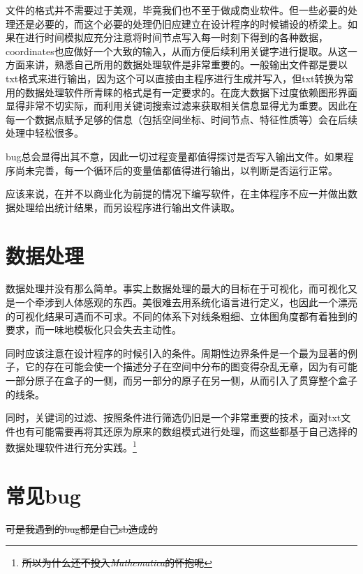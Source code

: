 \documentclass[12pt,a4paper]{article}
\begin{document}
文件的格式并不需要过于美观，毕竟我们也不至于做成商业软件。但一些必要的处理还是必要的，而这个必要的处理仍旧应建立在设计程序的时候铺设的桥梁上。如果在进行时间模拟应充分注意将时间节点写入每一时刻下得到的各种数据，coordinates也应做好一个大致的输入，从而方便后续利用关键字进行提取。从这一方面来讲，熟悉自己所用的数据处理软件是非常重要的。一般输出文件都是要以txt格式来进行输出，因为这个可以直接由主程序进行生成并写入，但txt转换为常用的数据处理软件所青睐的格式是有一定要求的。在庞大数据下过度依赖图形界面显得非常不切实际，而利用关键词搜索过滤来获取相关信息显得尤为重要。因此在每一个数据点赋予足够的信息（包括空间坐标、时间节点、特征性质等）会在后续处理中轻松很多。

bug总会显得出其不意，因此一切过程变量都值得探讨是否写入输出文件。如果程序尚未完善，每一个循环后的变量值都值得进行输出，以判断是否运行正常。

应该来说，在并不以商业化为前提的情况下编写软件，在主体程序不应一并做出数据处理给出统计结果，而另设程序进行输出文件读取。

\section{数据处理}
数据处理并没有那么简单。事实上数据处理的最大的目标在于可视化，而可视化又是一个牵涉到人体感观的东西。美很难去用系统化语言进行定义，也因此一个漂亮的可视化结果可遇而不可求。不同的体系下对线条粗细、立体图角度都有着独到的要求，而一味地模板化只会失去主动性。

同时应该注意在设计程序的时候引入的条件。周期性边界条件是一个最为显著的例子，它的存在可能会使一个描述分子在空间中分布的图变得杂乱无章，因为有可能一部分原子在盒子的一侧，而另一部分的原子在另一侧，从而引入了贯穿整个盒子的线条。

同时，关键词的过滤、按照条件进行筛选仍旧是一个非常重要的技术，面对txt文件也有可能需要再将其还原为原来的数组模式进行处理，而这些都基于自己选择的数据处理软件进行充分实践。\footnote{\sout{所以为什么还不投入\emph{Mathematica}的怀抱呢}}

\section{常见bug}
{\Large \sout{可是我遇到的bug都是自己sb造成的}}
\end{document}
